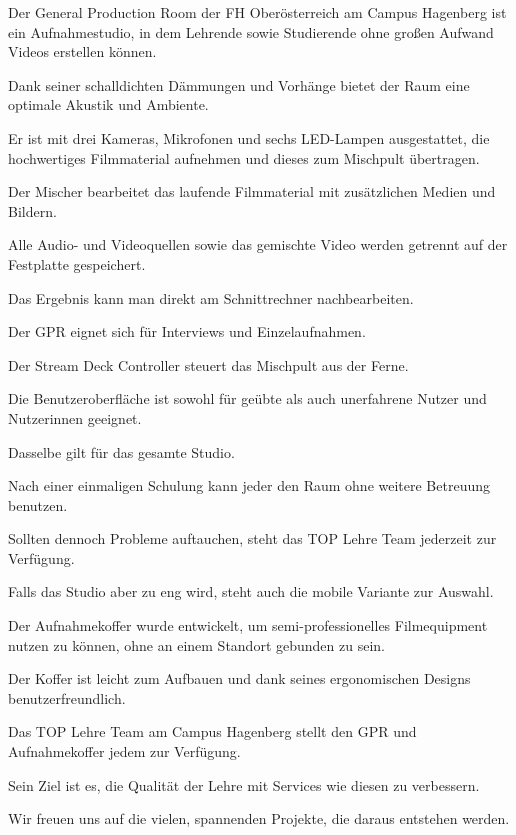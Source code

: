 \documentclass{screenplay}
\begin{document}
	Der General Production Room der FH Oberösterreich am Campus Hagenberg ist ein Aufnahmestudio, in dem Lehrende sowie Studierende ohne großen Aufwand Videos erstellen können.
	
	Dank seiner schalldichten Dämmungen und Vorhänge bietet der Raum eine optimale Akustik und Ambiente.
		
	Er ist mit drei Kameras, Mikrofonen und sechs LED-Lampen ausgestattet, die hochwertiges Filmmaterial aufnehmen und dieses zum Mischpult übertragen.
		
	Der Mischer bearbeitet das laufende Filmmaterial mit zusätzlichen Medien und Bildern.
	
	Alle Audio- und Videoquellen sowie das gemischte Video werden getrennt auf der Festplatte gespeichert.
	
	Das Ergebnis kann man direkt am Schnittrechner nachbearbeiten.
	
	Der GPR eignet sich für Interviews und Einzelaufnahmen.
	
	Der Stream Deck Controller steuert das Mischpult aus der Ferne.
	
	Die Benutzeroberfläche ist sowohl für geübte als auch unerfahrene Nutzer und Nutzerinnen geeignet.
		
	Dasselbe gilt für das gesamte Studio.
	
	Nach einer einmaligen Schulung kann jeder den Raum ohne weitere Betreuung benutzen.
	
	Sollten dennoch Probleme auftauchen, steht das TOP Lehre Team jederzeit zur Verfügung.
	
	Falls das Studio aber zu eng wird, steht auch die mobile Variante zur Auswahl.
		
	Der Aufnahmekoffer wurde entwickelt, um semi-professionelles Filmequipment nutzen zu können, ohne an einem Standort gebunden zu sein.
		
	Der Koffer ist leicht zum Aufbauen und dank seines ergonomischen Designs benutzerfreundlich.
		
	Das TOP Lehre Team am Campus Hagenberg stellt den GPR und Aufnahmekoffer jedem zur Verfügung.
	
	Sein Ziel ist es, die Qualität der Lehre mit Services wie diesen zu verbessern.
	
	Wir freuen uns auf die vielen, spannenden Projekte, die daraus entstehen werden.
\end{document}

